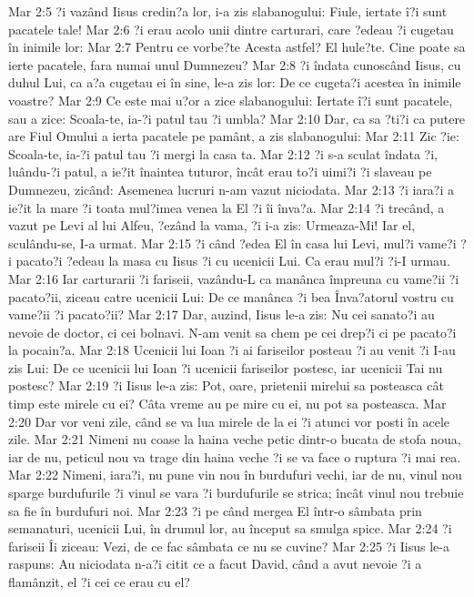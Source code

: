 Mar 2:5  ?i vazând Iisus credin?a lor, i-a zis slabanogului: Fiule, iertate î?i sunt pacatele tale!
Mar 2:6  ?i erau acolo unii dintre carturari, care ?edeau ?i cugetau în inimile lor:
Mar 2:7  Pentru ce vorbe?te Acesta astfel? El hule?te. Cine poate sa ierte pacatele, fara numai unul Dumnezeu?
Mar 2:8  ?i îndata cunoscând Iisus, cu duhul Lui, ca a?a cugetau ei în sine, le-a zis lor: De ce cugeta?i acestea în inimile voastre?
Mar 2:9  Ce este mai u?or a zice slabanogului: Iertate î?i sunt pacatele, sau a zice: Scoala-te, ia-?i patul tau ?i umbla?
Mar 2:10  Dar, ca sa ?ti?i ca putere are Fiul Omului a ierta pacatele pe pamânt, a zis slabanogului:
Mar 2:11  Zic ?ie: Scoala-te, ia-?i patul tau ?i mergi la casa ta.
Mar 2:12  ?i s-a sculat îndata ?i, luându-?i patul, a ie?it înaintea tuturor, încât erau to?i uimi?i ?i slaveau pe Dumnezeu, zicând: Asemenea lucruri n-am vazut niciodata.
Mar 2:13  ?i iara?i a ie?it la mare ?i toata mul?imea venea la El ?i îi înva?a.
Mar 2:14  ?i trecând, a vazut pe Levi al lui Alfeu, ?ezând la vama, ?i i-a zis: Urmeaza-Mi! Iar el, sculându-se, I-a urmat.
Mar 2:15  ?i când ?edea El în casa lui Levi, mul?i vame?i ?i pacato?i ?edeau la masa cu Iisus ?i cu ucenicii Lui. Ca erau mul?i ?i-I urmau.
Mar 2:16  Iar carturarii ?i fariseii, vazându-L ca manânca împreuna cu vame?ii ?i pacato?ii, ziceau catre ucenicii Lui: De ce manânca ?i bea Înva?atorul vostru cu vame?ii ?i pacato?ii?
Mar 2:17  Dar, auzind, Iisus le-a zis: Nu cei sanato?i au nevoie de doctor, ci cei bolnavi. N-am venit sa chem pe cei drep?i ci pe pacato?i la pocain?a.
Mar 2:18  Ucenicii lui Ioan ?i ai fariseilor posteau ?i au venit ?i I-au zis Lui: De ce ucenicii lui Ioan ?i ucenicii fariseilor postesc, iar ucenicii Tai nu postesc?
Mar 2:19  ?i Iisus le-a zis: Pot, oare, prietenii mirelui sa posteasca cât timp este mirele cu ei? Câta vreme au pe mire cu ei, nu pot sa posteasca.
Mar 2:20  Dar vor veni zile, când se va lua mirele de la ei ?i atunci vor posti în acele zile.
Mar 2:21  Nimeni nu coase la haina veche petic dintr-o bucata de stofa noua, iar de nu, peticul nou va trage din haina veche ?i se va face o ruptura ?i mai rea.
Mar 2:22  Nimeni, iara?i, nu pune vin nou în burdufuri vechi, iar de nu, vinul nou sparge burdufurile ?i vinul se vara ?i burdufurile se strica; încât vinul nou trebuie sa fie în burdufuri noi.
Mar 2:23  ?i pe când mergea El într-o sâmbata prin semanaturi, ucenicii Lui, în drumul lor, au început sa smulga spice.
Mar 2:24  ?i fariseii Îi ziceau: Vezi, de ce fac sâmbata ce nu se cuvine?
Mar 2:25  ?i Iisus le-a raspuns: Au niciodata n-a?i citit ce a facut David, când a avut nevoie ?i a flamânzit, el ?i cei ce erau cu el?
